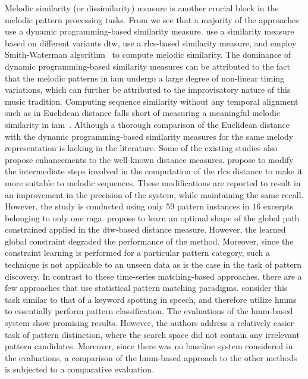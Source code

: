 Melodic similarity (or dissimilarity) measure is another crucial block in the melodic pattern processing tasks. From  we see that a majority of the approaches use a dynamic programming-based similarity measure. \cite{Ross2012,Ross2012b,rao2013distinguishing,Rao2014} use a similarity measure based on different variants \gls{dtw}, \cite{Ishwar2013,Dutta2014,dutta2014modified} use a \gls{rlcs}-based similarity measure, and \cite{ganguli2015efficient} employ Smith-Waterman algorithm~\citep{smith1981identification} to compute melodic similarity. The dominance of dynamic programming-based similarity measures can be attributed to the fact that the melodic patterns in \gls{iam} undergo a large degree of non-linear timing variations, which can further be attributed to the improvisatory nature of this music tradition. Computing sequence similarity without any temporal alignment such as in Euclidean distance falls short of measuring a meaningful melodic similarity in \gls{iam}~\citep{Ross2012b}. Although a thorough comparison of the Euclidean distance with the dynamic programming-based similarity measures for the same melody representation is lacking in the literature. Some of the existing studies also propose enhancements to the well-known distance measures. \cite{dutta2014modified} propose to modify the intermediate steps involved in the computation of the \gls{rlcs} distance to make it more suitable to melodic sequences. These modifications are reported to result in an improvement in the precision of the system, while maintaining the same recall. However, the study is conducted using only 59 pattern instances in 16 excerpts belonging to only one \gls{raga}. \cite{Rao2014} propose to learn an optimal shape of the global path constrained applied in the \gls{dtw}-based distance measure. However, the learned global constraint degraded the performance of the method. Moreover, since the constraint learning is performed for a particular pattern category, such a technique is not applicable to an unseen data as is the case in the task of pattern discovery. In contrast to these time-series matching-based approaches, there are a few approaches that use statistical pattern matching paradigms. \cite{ishwar2012motivic,Rao2014} consider this task similar to that of a keyword spotting in speech, and therefore utilize \glspl{hmm} to essentially perform pattern classification. The evaluations of the \gls{hmm}-based system show promising results. However, the authors address a relatively easier task of pattern distinction, where the search space did not contain any irrelevant pattern candidates. Moreover, since there was no baseline system considered in the evaluations, a comparison of the \gls{hmm}-based approach to the other methods is subjected to a comparative evaluation.

